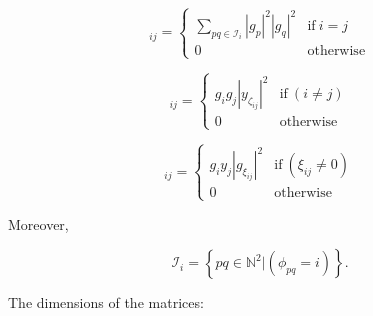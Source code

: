 \documentclass[a4paper,fleqn,usenatbib]{mnras}
\begin{document}
\begin{equation}
[\boldsymbol{E}]_{ij} = 
\begin{cases}
 \sum_{pq \in \mathcal{I}_i} \left | g_p \right |^2 \left | g_q \right |^2  & \textrm{if} ~ i=j\\
 0 & \textrm{otherwise}
\end{cases}
\end{equation}

\begin{equation}
[\boldsymbol{F}]_{ij} = 
\begin{cases}
 g_i g_j  \left | y_{\zeta_{ij}} \right |^2  & \textrm{if} ~ (i \neq j)\\
 0 & \textrm{otherwise}
\end{cases}
\end{equation}

\begin{equation}
[\boldsymbol{G}]_{ij} = 
\begin{cases}
 g_i y_j  \left | g_{\xi_{ij}} \right |^2  & \textrm{if} ~ (\xi_{ij}\neq0)\\
 0 & \textrm{otherwise}
\end{cases}
\end{equation}

Moreover, 

\begin{equation}
\mathcal{I}_i = \left\{pq\in\mathbb{N}^2|(\phi_{pq} = i) \right\}.
\end{equation}

The dimensions of the matrices:
\end{document}
